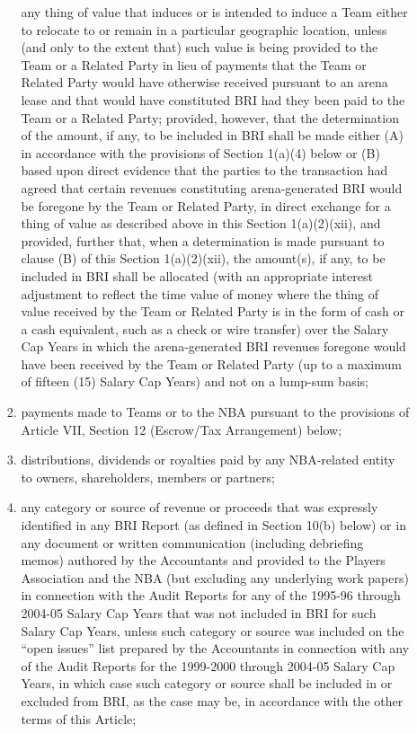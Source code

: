\documentclass[
]{book}
\begin{document}
\begin{enumerate}
\begin{enumerate}
\begin{enumerate}
      any thing of value that induces or is intended to induce a Team either to relocate to or remain in a particular geographic location, unless (and only to the extent that) such value is being provided to the Team or a Related Party in lieu of payments that the Team or Related Party would have otherwise received pursuant to an arena lease and that would have constituted BRI had they been paid to the Team or a Related Party; provided, however, that the determination of the amount, if any, to be included in BRI shall be made either (A) in accordance with the provisions of Section 1(a)(4) below or (B) based upon direct evidence that the parties to the transaction had agreed that certain revenues constituting arena-generated BRI would be foregone by the Team or Related Party, in direct exchange for a thing of value as described above in this Section 1(a)(2)(xii), and provided, further that, when a determination is made pursuant to clause (B) of this Section 1(a)(2)(xii), the amount(s), if any, to be included in BRI shall be allocated (with an appropriate interest adjustment to reflect the time value of money where the thing of value received by the Team or Related Party is in the form of cash or a cash equivalent, such as a check or wire transfer) over the Salary Cap Years in which the arena-generated BRI revenues foregone would have been received by the Team or Related Party (up to a maximum of fifteen (15) Salary Cap Years) and not on a lump-sum basis;
    \item
      payments made to Teams or to the NBA pursuant to the provisions of Article VII, Section 12 (Escrow/Tax Arrangement) below;
    \item
      distributions, dividends or royalties paid by any NBA-related entity to owners, shareholders, members or partners;
    \item
      any category or source of revenue or proceeds that was expressly identified in any BRI Report (as defined in Section 10(b) below) or in any document or written communication (including debriefing memos) authored by the Accountants and provided to the Players Association and the NBA (but excluding any underlying work papers) in connection with the Audit Reports for any of the 1995-96 through 2004-05 Salary Cap Years that was not included in BRI for such Salary Cap Years, unless such category or source was included on the ``open issues'' list prepared by the Accountants in connection with any of the Audit Reports for the 1999-2000 through 2004-05 Salary Cap Years, in which case such category or source shall be included in or excluded from BRI, as the case may be, in accordance with the other terms of this Article;

\end{enumerate}
\end{enumerate}
\end{enumerate}
\end{document}

